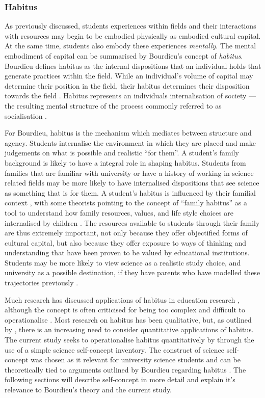 \subsubsection*{Habitus}
As previously discussed, students experiences within fields and their interactions with resources may begin to be embodied physically as embodied cultural capital. At the same time, students also embody these experiences \textit{mentally}. The mental embodiment of capital can be summarised by Bourdieu's concept  of \textit{habitus}. Bourdieu defines habitus as the internal dispositions that an individual holds that generate practices within the field. While an individual's volume of capital may determine their position in the field, their habitus determines their disposition towards the field \cite{bourdieu1992invitation}. Habitus represents an individuals internalisation of society --- the resulting mental structure of the process commonly referred to as socialisation \cite{Nash1999}.

For Bourdieu, habitus is the mechanism which mediates between structure and agency. Students internalise the environment in which they are placed and make judgements on what is possible and realistic ``for them''. A student's family background is likely to have a integral role in shaping habitus. Students from families that are familiar with university or have a history of working in science related fields may be more likely to have internalised dispositions that see science as something that is for them. A student's habitus is influenced by their familial context \cite{Dimaggio1982}, with some theorists pointing to the concept of ``family habitus'' as a tool to understand how family resources, values, and life style choices are internalised by children \cite{Archer2012,tomanovic2004family}. The resources available to students through their family are thus extremely important, not only because they offer objectified forms of cultural capital, but also because they offer exposure to ways of thinking and understanding that have been proven to be valued by educational institutions. Students may be more likely to view science as a realistic study choice, and university as a possible destination, if they have parents who have modelled these trajectories previously \cite{Lyons_2006}. 

Much research has discussed applications of habitus in education research \cite{Reay_2004,Nash1999}, although the concept is often criticised for being too complex \cite{goldhaber2000does} and difficult to operationalise \cite{dumais2002cultural}. Most research on habitus has been qualitative, but, as outlined by \cite{mu2014heritage}, there is an increasing need to consider quantitative applications of habitus. The current study seeks to operationalise habitus quantitatively by through the use of a simple science self-concept inventory. The construct of science self-concept was chosen as it relevant for university science students and can be theoretically tied to arguments outlined by Bourdieu regarding habitus \cite{mu2014heritage,bodovski2014adolescents}. The following sections will describe self-concept in more detail and explain it's relevance to Bourdieu's theory and the current study.   

